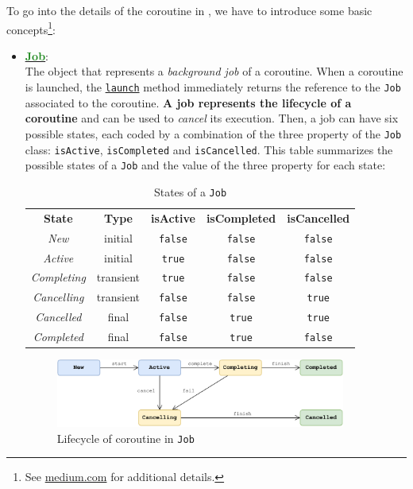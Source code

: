 To go into the details of the coroutine in \Kotlin, we have to introduce some basic concepts\footnote{See \href{https://medium.com/mobile-app-development-publication/kotlin-coroutine-scope-context-and-job-made-simple-5adf89fcfe94}{medium.com} for additional details.}:
\begin{itemize}
	\item \href{https://kotlinlang.org/api/kotlinx.coroutines/kotlinx-coroutines-core/kotlinx.coroutines/-job/}{\underline{\textbf{\textcolor{ForestGreen}{Job}}}}:\\
	The object that represents a \textit{background job} of a coroutine. When a coroutine is launched, the \href{https://kotlinlang.org/api/kotlinx.coroutines/kotlinx-coroutines-core/kotlinx.coroutines/launch.html}{\texttt{launch}} method immediately returns the reference to the \texttt{Job} associated to the coroutine. \textbf{A job represents the lifecycle of a coroutine} and can be used to \textit{cancel} its execution. Then, a job can have six possible states, each coded by a combination of the three property of the \texttt{Job} class: \texttt{isActive}, \texttt{isCompleted} and \texttt{isCancelled}.
	This table summarizes the possible states of a \texttt{Job} and the value of the three property for each state:
	\begin{table}[h!]
		\centering
		\begin{tabular}{ccccc}
			\textbf{State} & \textbf{Type} & \textbf{isActive} & \textbf{isCompleted} & \textbf{isCancelled} \\
			\textit{New}        & initial   & \texttt{false} & \texttt{false} & \texttt{false} \\
			\textit{Active}     & initial   & \texttt{true}  & \texttt{false} & \texttt{false} \\
			\textit{Completing} & transient & \texttt{true}  & \texttt{false} & \texttt{false} \\
			\textit{Cancelling} & transient & \texttt{false} & \texttt{false} & \texttt{true}  \\
			\textit{Cancelled}  & final     & \texttt{false} & \texttt{true}  & \texttt{true}  \\
			\textit{Completed}  & final     & \texttt{false} & \texttt{true}  & \texttt{false}
		\end{tabular}
		\caption{States of a \texttt{Job}}
		\label{tab:job_states}
	\end{table}

	\begin{figure}[h!]
		\centering
		\includegraphics[width=0.9\textwidth]{img/kotlin_coroutines_lifecycle}
		\caption{Lifecycle of \Kotlin coroutine in \texttt{Job}}
		\label{fig::kotlin_coroutines_lifecycle}
	\end{figure}


\end{itemize}
